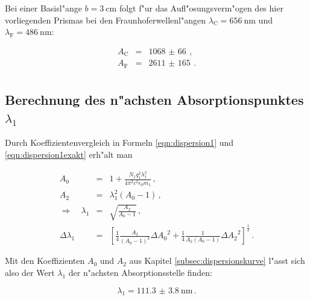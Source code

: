 		\clearpage

		Bei einer Basisl"ange $b = \SI{3}{\centi \meter}$ folgt f"ur das Aufl"osungsverm"ogen des hier vorliegenden Prismas bei den Fraunhoferwellenl"angen $\lambda_\mathrm{C} = \SI{656}{\nano \meter}$ und $\lambda_\mathrm{F} = \SI{486}{\nano \meter}$:

		\begin{eqnarray*}
			A_\mathrm{C} & = & \SI{1068(66)}{} \,, \\
			A_\mathrm{F} & = & \SI{2611(165)}{} \,. \\
		\end{eqnarray*}

	\subsection{Berechnung des n"achsten Absorptionspunktes $\lambda_\mathrm{1}$}
	\label{subsec:absorptionspunkt}
		Durch Koeffizientenvergleich in Formeln \eqref{eqn:dispersion1} und \eqref{eqn:dispersion1exakt} erh"alt man

		\begin{eqnarray*}
			A_0 & = & 1 + \frac{N_1 q_1^2 \lambda_1^2}{4 \pi^2 c^2 \epsilon_0 m_1} \,, \\
			A_2 & = & \lambda_1^2 (A_0 - 1) \,, \\
			\Rightarrow \quad \lambda_1 & = & \sqrt{\frac{A_2}{A_0 - 1}} \,, \\
			\Delta \lambda_1 & = & \left[\frac{1}{4}\frac{A_2}{(A_0 - 1)^3} \Delta {A_0}^2 + \frac{1}{4}\frac{1}{A_2 (A_0 - 1)} \Delta {A_2}^2\right]^\frac{1}{2} \,.
		\end{eqnarray*}

		Mit den Koeffizienten $A_0$ und $A_2$ aus Kapitel \ref{subsec:dispersionskurve} l"asst sich also der Wert $\lambda_1$ der n"achsten Absorptionsstelle finden:

		\begin{equation*}
			\lambda_1 = \SI{111.3(38)}{\nano \meter} \,.
		\end{equation*}
